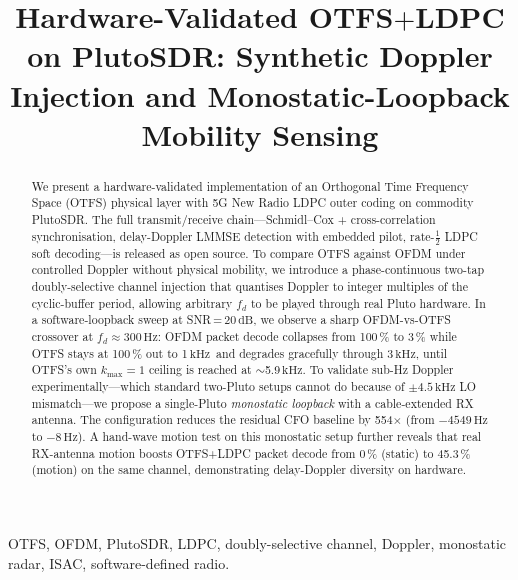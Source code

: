 \documentclass[conference,10pt]{IEEEtran}
\newcommand{\fd}{f_d}
\newcommand{\kmax}{k_{\max}}
\newcommand{\dB}{\ensuremath{\,\mathrm{dB}}}
\newcommand{\Hz}{\ensuremath{\,\mathrm{Hz}}}
\newcommand{\kHz}{\ensuremath{\,\mathrm{kHz}}}
\begin{document}
\title{Hardware-Validated OTFS$+$LDPC on PlutoSDR: Synthetic Doppler Injection and Monostatic-Loopback Mobility Sensing}

\author{
}

\maketitle

\begin{abstract}
We present a hardware-validated implementation of an Orthogonal Time Frequency Space (OTFS) physical layer with 5G New Radio LDPC outer coding on commodity PlutoSDR. The full transmit/receive chain---Schmidl--Cox + cross-correlation synchronisation, delay-Doppler LMMSE detection with embedded pilot, rate-$\tfrac{1}{2}$ LDPC soft decoding---is released as open source. To compare OTFS against OFDM under controlled Doppler without physical mobility, we introduce a phase-continuous two-tap doubly-selective channel injection that quantises Doppler to integer multiples of the cyclic-buffer period, allowing arbitrary $\fd$ to be played through real Pluto hardware. In a software-loopback sweep at SNR\,=\,20\dB, we observe a sharp OFDM-vs-OTFS crossover at $\fd \approx 300\Hz$: OFDM packet decode collapses from 100\,\% to 3\,\% while OTFS stays at 100\,\% out to 1\kHz\ and degrades gracefully through 3\kHz, until OTFS's own $\kmax{=}1$ ceiling is reached at $\sim$5.9\kHz. To validate sub-Hz Doppler experimentally---which standard two-Pluto setups cannot do because of $\pm 4.5\kHz$ LO mismatch---we propose a single-Pluto \emph{monostatic loopback} with a cable-extended RX antenna. The configuration reduces the residual CFO baseline by 554$\times$ (from $-4549\Hz$ to $-8\Hz$). A hand-wave motion test on this monostatic setup further reveals that real RX-antenna motion boosts OTFS+LDPC packet decode from 0\,\% (static) to 45.3\,\% (motion) on the same channel, demonstrating delay-Doppler diversity on hardware.
\end{abstract}

\begin{IEEEkeywords}
OTFS, OFDM, PlutoSDR, LDPC, doubly-selective channel, Doppler, monostatic radar, ISAC, software-defined radio.
\end{IEEEkeywords}
\end{document}
